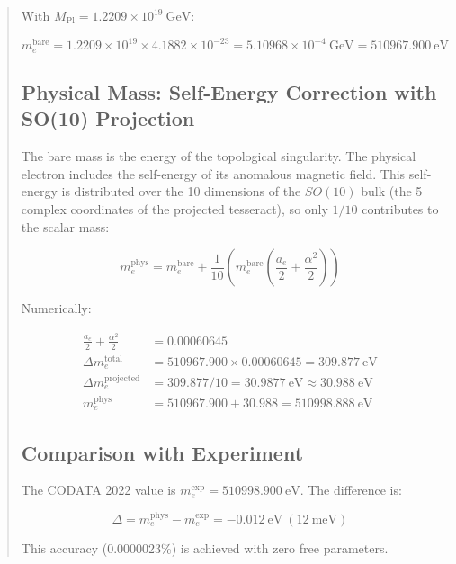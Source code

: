 \documentclass[12pt]{article}
\begin{document}
\begin{abstract}
With \(M_{\text{Pl}} = 1.2209 \times 10^{19}\ \text{GeV}\):

\begin{equation}
m_e^{\text{bare}} = 1.2209 \times 10^{19} \times 4.1882 \times 10^{-23} = 5.10968 \times 10^{-4}\ \text{GeV} = 510967.900\ \text{eV}
\end{equation}

\subsection{Physical Mass: Self-Energy Correction with SO(10) Projection}

The bare mass is the energy of the topological singularity. The physical electron includes the self-energy of its anomalous magnetic field. This self-energy is distributed over the 10 dimensions of the \(SO(10)\) bulk (the 5 complex coordinates of the projected tesseract), so only \(1/10\) contributes to the scalar mass:

\begin{equation}
\boxed{
m_e^{\text{phys}} = m_e^{\text{bare}} + \frac{1}{10}\left( m_e^{\text{bare}}\left(\frac{a_e}{2} + \frac{\alpha^2}{2}\right) \right)
}
\label{eq:me_phys}
\end{equation}

Numerically:

\begin{align}
\frac{a_e}{2} + \frac{\alpha^2}{2} &= 0.00060645 \\
\Delta m_e^{\text{total}} &= 510967.900 \times 0.00060645 = 309.877\ \text{eV} \\
\Delta m_e^{\text{projected}} &= 309.877 / 10 = 30.9877\ \text{eV} \approx 30.988\ \text{eV} \\
m_e^{\text{phys}} &= 510967.900 + 30.988 = 510998.888\ \text{eV}
\end{align}

\subsection{Comparison with Experiment}

The CODATA 2022 value is \(m_e^{\text{exp}} = 510998.900\ \text{eV}\). The difference is:

\begin{equation}
\Delta = m_e^{\text{phys}} - m_e^{\text{exp}} = -0.012\ \text{eV} \ (12\ \text{meV})
\end{equation}

This accuracy (0.0000023\%) is achieved with zero free parameters.


\end{abstract}
\end{document}
